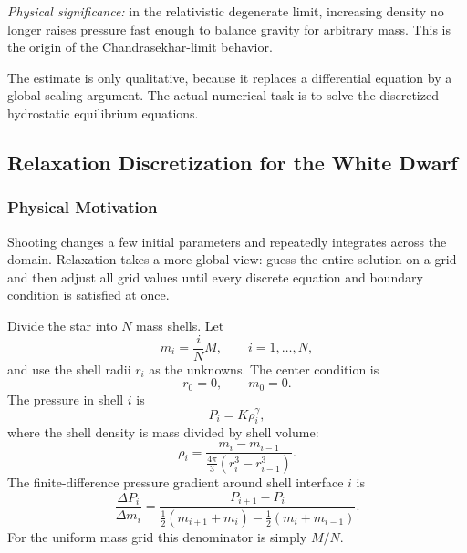 \textit{Physical significance:} in the relativistic degenerate limit,
increasing density no longer raises pressure fast enough to balance gravity
for arbitrary mass. This is the origin of the Chandrasekhar-limit behavior.

The estimate is only qualitative, because it replaces a differential
equation by a global scaling argument. The actual numerical task is to solve
the discretized hydrostatic equilibrium equations.

\subsection{Relaxation Discretization for the White Dwarf}
\label{subsec:lec07:relaxation}

\subsubsection*{Physical Motivation}
Shooting changes a few initial parameters and repeatedly integrates across
the domain. Relaxation takes a more global view: guess the entire solution
on a grid and then adjust all grid values until every discrete equation and
boundary condition is satisfied at once.

Divide the star into $N$ mass shells. Let
\begin{equation}
    m_i=\frac{i}{N}M,
    \qquad i=1,\ldots,N,
    \label{eq:lec07:mass-grid}
\end{equation}
and use the shell radii $r_i$ as the unknowns. The center condition is
\begin{equation}
    r_0=0,
    \qquad
    m_0=0.
    \label{eq:lec07:center-conditions}
\end{equation}
The pressure in shell $i$ is
\begin{equation}
    P_i=K\rho_i^\gamma,
    \label{eq:lec07:shell-pressure}
\end{equation}
where the shell density is mass divided by shell volume:
\begin{equation}
    \rho_i=
    \frac{m_i-m_{i-1}}
    {\frac{4\pi}{3}\left(r_i^3-r_{i-1}^3\right)}.
    \label{eq:lec07:shell-density}
\end{equation}
The finite-difference pressure gradient around shell interface $i$ is
\begin{equation}
    \frac{\Delta P_i}{\Delta m_i}
    =
    \frac{P_{i+1}-P_i}
    {\frac{1}{2}(m_{i+1}+m_i)-\frac{1}{2}(m_i+m_{i-1})}.
    \label{eq:lec07:pressure-gradient-discrete}
\end{equation}
For the uniform mass grid this denominator is simply $M/N$.

